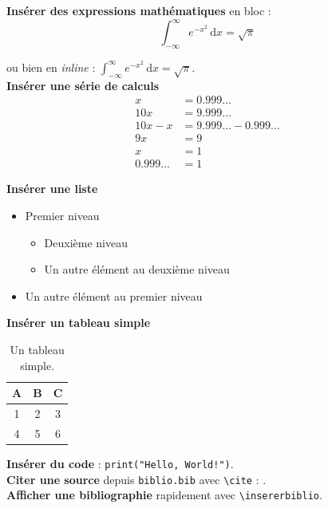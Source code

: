 \documentclass{rapportECL2024}
\begin{document}
\textbf{Insérer des expressions mathématiques} en bloc :
\begin{equation*}
    \int_{-\infty}^{\infty} e^{-x^2} \, \text{d}x = \sqrt{\pi}
\end{equation*}

ou bien en \textit{inline} : $\int_{-\infty}^{\infty} e^{-x^2} \, \text{d}x = \sqrt{\pi}$.\\


\textbf{Insérer une série de calculs}
\begin{align*}
    x &= 0.999\ldots \\
    10x &= 9.999\ldots \\
    10x - x &= 9.999\ldots - 0.999\ldots \\
    9x &= 9 \\
    x &= 1 \\
    0.999\ldots &= 1
\end{align*}


\textbf{Insérer une liste}
\begin{itemize}
    \item Premier niveau
    \begin{itemize}
        \item Deuxième niveau
        \item Un autre élément au deuxième niveau
    \end{itemize}
    \item Un autre élément au premier niveau\\
\end{itemize}


\textbf{Insérer un tableau simple} \\
\begin{table}[H]
    \centering
    \begin{tabular}{|c|c|c|}
        \hline
        A & B & C \\
        \hline
        1 & 2 & 3 \\
        4 & 5 & 6 \\
        \hline
    \end{tabular}
    \caption{Un tableau simple.}
    \label{tab:tableau_simple}
\end{table}


\textbf{Insérer du code} : \texttt{print("Hello, World!")}.\\


\textbf{Citer une source} depuis \texttt{biblio.bib} avec \texttt{\textbackslash cite} : \cite{exemple_de_source}.\\


\textbf{Afficher une bibliographie} rapidement avec \texttt{\textbackslash insererbiblio}.

\insererbiblio 
\end{document}
